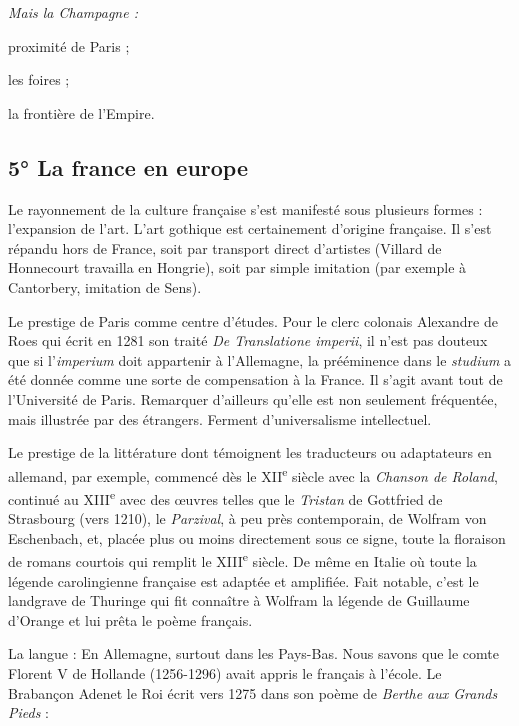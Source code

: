 \documentclass[french,twoside]{book} %
\newlength{\listmod}
\newcommand{\listhead}[1]{\hspace{-1\listmod}\emph{#1}}
\def\bignobreak{\ifdim\lastskip<\bigskipamount
  \removelastskip\nopagebreak\bigskip\fi}
\newcommand{\labelblock}[1]{\bigbreak{\color{rubric}\noindent\textbf{#1}\par}\bignobreak}
\begin{document}
\begin{listalpha}[itemsep=0pt,]
\item[]\listhead{Mais la Champagne :}
\item proximité de Paris ;
\item les foires ;
\item la frontière de l’Empire.

\end{listalpha}\subsection[5° La france en europe]{5° La france en europe}
\label{c03c5}

\labelblock{— Aspect culturel.}

\noindent Le rayonnement de la culture française s’est manifesté sous plusieurs formes : l’expansion de l’art. L’art gothique est certainement d’origine française. Il s’est répandu hors de France, soit par transport direct d’artistes (Villard de Honnecourt travailla en Hongrie), soit par simple imitation (par exemple à Cantorbery, imitation de Sens).\par
Le prestige de Paris comme centre d’études. Pour le clerc colonais Alexandre de Roes qui écrit en 1281 son traité {\itshape De Translatione imperii}, il n’est pas douteux que si l’{\itshape imperium} doit appartenir à l’Allemagne, la prééminence dans le {\itshape studium} a été donnée comme une sorte de compensation à la France. Il s’agit avant tout de l’Université de Paris. Remarquer d’ailleurs qu’elle est non seulement fréquentée, mais illustrée par des étrangers. Ferment d’universalisme intellectuel.\par
Le prestige de la littérature dont témoignent les traducteurs ou adaptateurs en allemand, par exemple, commencé dès le XII\textsuperscript{e} siècle avec la {\itshape Chanson de Roland}, continué au XIII\textsuperscript{e} avec des œuvres telles que le {\itshape Tristan} de Gottfried de Strasbourg (vers 1210), le {\itshape Parzival}, à peu près contemporain, de Wolfram von Eschenbach, et, placée plus ou moins directement sous ce signe, toute la floraison de romans courtois qui remplit le XIII\textsuperscript{e} siècle. De même en Italie où toute la légende carolingienne française est adaptée et amplifiée. Fait notable, c’est le landgrave de Thuringe qui fit connaître à Wolfram la légende de Guillaume d’Orange et lui prêta le poème français.\par
La langue : En Allemagne, surtout dans les Pays-Bas. Nous savons que le comte Florent V de Hollande (1256-1296) avait appris le français à l’école. Le Brabançon Adenet le Roi écrit vers 1275 dans son poème de {\itshape Berthe aux Grands Pieds} :\par
\end{document}
